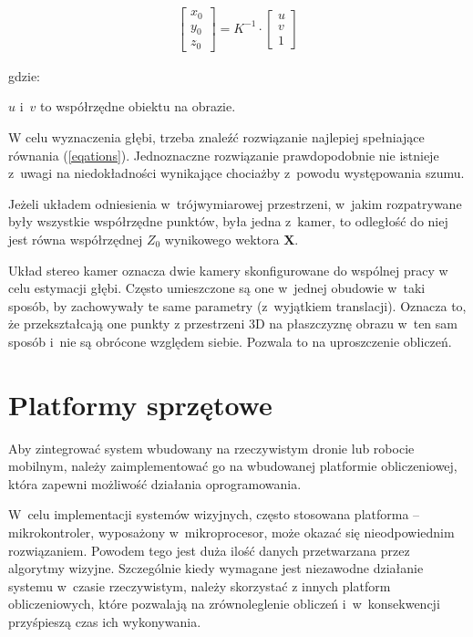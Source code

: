 \begin{align}
    \begin{bmatrix} x_0 \\ y_0 \\ z_0 \end{bmatrix} = K^{-1} \cdot \begin{bmatrix} u \\ v \\ 1 \end{bmatrix} \label{2d3d}
\end{align}

\noindent gdzie:

$u$ i~$v$ to współrzędne obiektu na obrazie.
\vspace{11px}

W celu wyznaczenia głębi, trzeba znaleźć rozwiązanie najlepiej spełniające równania (\ref{eqations}). Jednoznaczne rozwiązanie prawdopodobnie nie istnieje z~uwagi na niedokładności wynikające chociażby z~powodu występowania szumu.

Jeżeli układem odniesienia w~trójwymiarowej przestrzeni, w~jakim rozpatrywane były wszystkie współrzędne punktów, była jedna z~kamer, to odległość do niej jest równa współrzędnej $Z_0$ wynikowego wektora $\mathbf{X}$.

\vspace{11px}

Układ stereo kamer oznacza dwie kamery skonfigurowane do wspólnej pracy w celu estymacji głębi. Często umieszczone są one w~jednej obudowie w~taki sposób, by zachowywały te same parametry (z~wyjątkiem translacji). Oznacza to, że przekształcają one punkty z przestrzeni 3D na płaszczyznę obrazu w~ten sam sposób i~nie są obrócone względem siebie. Pozwala to na uproszczenie obliczeń.

\section{Platformy sprzętowe}

Aby zintegrować system wbudowany na rzeczywistym dronie lub robocie mobilnym, należy zaimplementować go na wbudowanej platformie obliczeniowej, która zapewni możliwość działania oprogramowania.

W~celu implementacji systemów wizyjnych, często stosowana platforma -- mikrokontroler, wyposażony w~mikroprocesor, może okazać się nieodpowiednim rozwiązaniem. Powodem tego jest duża ilość danych przetwarzana przez algorytmy wizyjne. Szczególnie kiedy wymagane jest niezawodne działanie systemu w~czasie rzeczywistym, należy skorzystać z innych platform obliczeniowych, które pozwalają na zrównoleglenie obliczeń i~w~konsekwencji przyśpieszą czas ich wykonywania.

